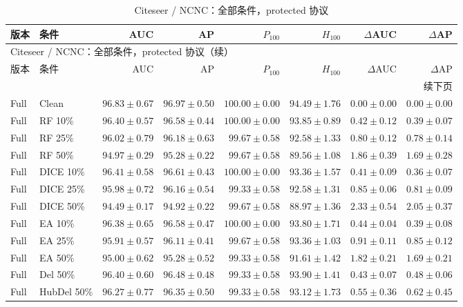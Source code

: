 {\footnotesize
\setlength{\tabcolsep}{3.2pt}
\renewcommand{\arraystretch}{1.10}
\begin{longtable}{llrrrrrr}
\caption{Citeseer / NCNC：全部条件，protected 协议}\\
\toprule
版本 & 条件 & AUC & AP & $P_{100}$ & $H_{100}$ & $\Delta$AUC & $\Delta$AP \\
\midrule
\endfirsthead
\multicolumn{8}{l}{Citeseer / NCNC：全部条件，protected 协议（续）}\\
\toprule
版本 & 条件 & AUC & AP & $P_{100}$ & $H_{100}$ & $\Delta$AUC & $\Delta$AP \\
\midrule
\endhead
\midrule\multicolumn{8}{r}{续下页}\\
\endfoot
\bottomrule
\endlastfoot
Full & Clean & $96.83\pm0.67$ & $96.97\pm0.50$ & $100.00\pm0.00$ & $94.49\pm1.76$ & $0.00\pm0.00$ & $0.00\pm0.00$ \\
Full & RF 10\% & $96.40\pm0.57$ & $96.58\pm0.44$ & $100.00\pm0.00$ & $93.85\pm0.89$ & $0.42\pm0.12$ & $0.39\pm0.07$ \\
Full & RF 25\% & $96.02\pm0.79$ & $96.18\pm0.63$ & $99.67\pm0.58$ & $92.58\pm1.33$ & $0.80\pm0.12$ & $0.78\pm0.14$ \\
Full & RF 50\% & $94.97\pm0.29$ & $95.28\pm0.22$ & $99.67\pm0.58$ & $89.56\pm1.08$ & $1.86\pm0.39$ & $1.69\pm0.28$ \\
Full & DICE 10\% & $96.41\pm0.58$ & $96.61\pm0.43$ & $100.00\pm0.00$ & $93.36\pm1.57$ & $0.41\pm0.09$ & $0.36\pm0.07$ \\
Full & DICE 25\% & $95.98\pm0.72$ & $96.16\pm0.54$ & $99.33\pm0.58$ & $92.58\pm1.31$ & $0.85\pm0.06$ & $0.81\pm0.09$ \\
Full & DICE 50\% & $94.49\pm0.17$ & $94.92\pm0.22$ & $99.67\pm0.58$ & $88.97\pm1.36$ & $2.33\pm0.54$ & $2.05\pm0.37$ \\
Full & EA 10\% & $96.38\pm0.65$ & $96.58\pm0.47$ & $100.00\pm0.00$ & $93.80\pm1.71$ & $0.44\pm0.04$ & $0.39\pm0.08$ \\
Full & EA 25\% & $95.91\pm0.57$ & $96.11\pm0.41$ & $99.67\pm0.58$ & $93.36\pm1.03$ & $0.91\pm0.11$ & $0.85\pm0.12$ \\
Full & EA 50\% & $95.00\pm0.62$ & $95.28\pm0.52$ & $99.33\pm0.58$ & $91.61\pm1.42$ & $1.82\pm0.21$ & $1.69\pm0.21$ \\
Full & Del 50\% & $96.40\pm0.60$ & $96.48\pm0.48$ & $99.33\pm0.58$ & $93.90\pm1.41$ & $0.43\pm0.07$ & $0.48\pm0.06$ \\
Full & HubDel 50\% & $96.27\pm0.77$ & $96.35\pm0.50$ & $99.33\pm0.58$ & $93.12\pm1.73$ & $0.55\pm0.36$ & $0.62\pm0.45$ \\

\end{longtable}}
